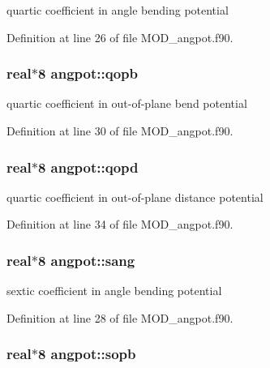 quartic coefficient in angle bending potential 



Definition at line 26 of file M\-O\-D\-\_\-angpot.\-f90.

\hypertarget{classangpot_ab17a7fab62bdf6365808195f222ec7e0}{
\subsubsection[{qopb}]{\setlength{\rightskip}{0pt plus 5cm}real$\ast$8 angpot\-::qopb}}\label{classangpot_ab17a7fab62bdf6365808195f222ec7e0}


quartic coefficient in out-\/of-\/plane bend potential 



Definition at line 30 of file M\-O\-D\-\_\-angpot.\-f90.

\hypertarget{classangpot_a9e0aceb949135ec0ff7e28f4908549f9}{
\subsubsection[{qopd}]{\setlength{\rightskip}{0pt plus 5cm}real$\ast$8 angpot\-::qopd}}\label{classangpot_a9e0aceb949135ec0ff7e28f4908549f9}


quartic coefficient in out-\/of-\/plane distance potential 



Definition at line 34 of file M\-O\-D\-\_\-angpot.\-f90.

\hypertarget{classangpot_a406ea898f2fd8574a2354e02b54c235a}{
\subsubsection[{sang}]{\setlength{\rightskip}{0pt plus 5cm}real$\ast$8 angpot\-::sang}}\label{classangpot_a406ea898f2fd8574a2354e02b54c235a}


sextic coefficient in angle bending potential 



Definition at line 28 of file M\-O\-D\-\_\-angpot.\-f90.

\hypertarget{classangpot_aecbb251975c3a907d275722e8e6a60bd}{
\subsubsection[{sopb}]{\setlength{\rightskip}{0pt plus 5cm}real$\ast$8 angpot\-::sopb}}\label{classangpot_aecbb251975c3a907d275722e8e6a60bd}



